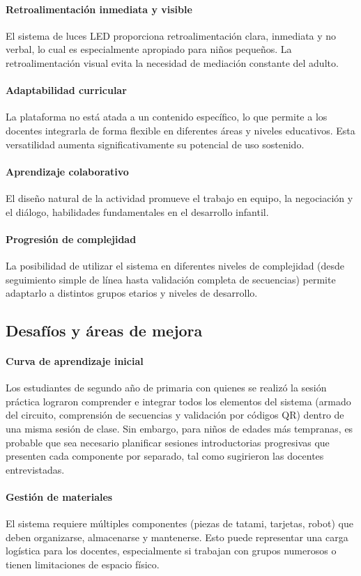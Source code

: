 \documentclass{prgrado}
\begin{document}
\paragraph{Retroalimentación inmediata y visible} El sistema de luces LED proporciona retroalimentación clara, inmediata y no verbal, lo cual es especialmente apropiado para niños pequeños. La retroalimentación visual evita la necesidad de mediación constante del adulto.
\paragraph{Adaptabilidad curricular} La plataforma no está atada a un contenido específico, lo que permite a los docentes integrarla de forma flexible en diferentes áreas y niveles educativos. Esta versatilidad aumenta significativamente su potencial de uso sostenido.
\paragraph{Aprendizaje colaborativo} El diseño natural de la actividad promueve el trabajo en equipo, la negociación y el diálogo, habilidades fundamentales en el desarrollo infantil.
\paragraph{Progresión de complejidad} La posibilidad de utilizar el sistema en diferentes niveles de complejidad (desde seguimiento simple de línea hasta validación completa de secuencias) permite adaptarlo a distintos grupos etarios y niveles de desarrollo.
\subsection{Desafíos y áreas de mejora}
\paragraph{Curva de aprendizaje inicial} Los estudiantes de segundo año de primaria con quienes se realizó la sesión práctica lograron comprender e integrar todos los elementos del sistema (armado del circuito, comprensión de secuencias y validación por códigos QR) dentro de una misma sesión de clase. Sin embargo, para niños de edades más tempranas, es probable que sea necesario planificar sesiones introductorias progresivas que presenten cada componente por separado, tal como sugirieron las docentes entrevistadas.
\paragraph{Gestión de materiales} El sistema requiere múltiples componentes (piezas de tatami, tarjetas, robot) que deben organizarse, almacenarse y mantenerse. Esto puede representar una carga logística para los docentes, especialmente si trabajan con grupos numerosos o tienen limitaciones de espacio físico.
\end{document}

